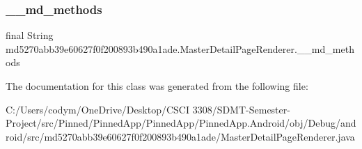 \subsubsection{\texorpdfstring{\+\_\+\+\_\+md\+\_\+methods}{\_\_md\_methods}}
{\footnotesize\ttfamily final String md5270abb39e60627f0f200893b490a1ade.\+Master\+Detail\+Page\+Renderer.\+\_\+\+\_\+md\+\_\+methods\hspace{0.3cm}{\ttfamily [static]}}



The documentation for this class was generated from the following file\+:\begin{DoxyCompactItemize}
\item 
C\+:/\+Users/codym/\+One\+Drive/\+Desktop/\+C\+S\+C\+I 3308/\+S\+D\+M\+T-\/\+Semester-\/\+Project/src/\+Pinned/\+Pinned\+App/\+Pinned\+App/\+Pinned\+App.\+Android/obj/\+Debug/android/src/md5270abb39e60627f0f200893b490a1ade/Master\+Detail\+Page\+Renderer.\+java\end{DoxyCompactItemize}

